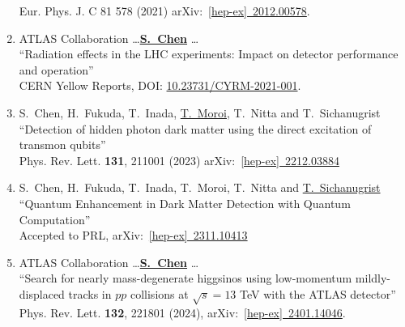 \documentclass[12pt]{article}
\begin{document}
\begin{enumerate}
          Eur. Phys. J. C 81 578 (2021) arXiv:~\href{https://arxiv.org/abs/2012.00578}{[hep-ex]~2012.00578}. \label{Pub::ATLPaper_muon_Run2}
%
	\item ATLAS Collaboration \dots \underline{\textbf{S.~Chen}} \dots \\
              ``Radiation effects in the LHC experiments: Impact on detector performance and operation'' \\ 
          CERN Yellow Reports, DOI: \href{https://e-publishing.cern.ch/index.php/CYRM/issue/view/129}{10.23731/CYRM-2021-001}. \label{Pub::CERN_YR_radiation}
%
	\item S.~Chen, H.~Fukuda, T.~Inada, \underline{T.~Moroi}, T.~Nitta and T.~Sichanugrist \\
          ``Detection of hidden photon dark matter using the direct excitation of transmon qubits'' \\
	    Phys. Rev. Lett. \textbf{131}, 211001 (2023)  arXiv:~\href{https://arxiv.org/abs/2212.03884}{[hep-ex]~2212.03884}   \label{Pub::DMQubits1}
%
	\item S.~Chen, H.~Fukuda, T.~Inada, T.~Moroi, T.~Nitta and \underline{T.~Sichanugrist} \\
          ``Quantum Enhancement in Dark Matter Detection with Quantum Computation'' \\
	    Accepted to PRL, arXiv:~\href{https://arxiv.org/abs/2311.10413}{[hep-ex]~2311.10413}   \label{Pub::DMQubits2}
%
	\item ATLAS Collaboration \dots \underline{\textbf{S.~Chen}} \dots \\
              ``Search for nearly mass-degenerate higgsinos using low-momentum mildly-displaced tracks in $pp$ collisions at $\sqrt{s}=13$ TeV with the ATLAS detector'' \\
            Phys. Rev. Lett. \textbf{132}, 221801 (2024), arXiv:~\href{https://arxiv.org/abs/2401.14046}{[hep-ex]~2401.14046}. \label{Pub::ATLPaper_EWKDisplacedTrack}
\end{enumerate}
\end{document}
